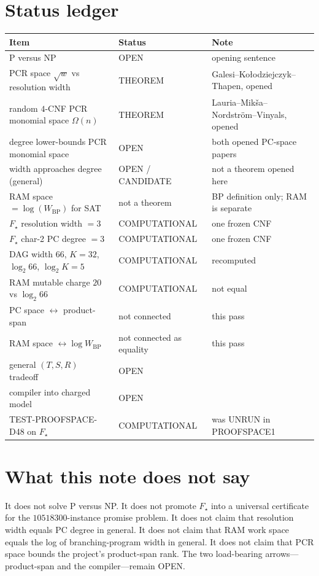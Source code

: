 \documentclass[11pt]{article}
\begin{document}
\section*{Status ledger}
\begin{center}
\begin{tabular}{@{}llp{2.4in}@{}}
\toprule
Item & Status & Note \\
\midrule
P versus NP & OPEN & opening sentence \\
PCR space \(\sqrt{w}\) vs resolution width & THEOREM & Galesi--Ko\l{}odziejczyk--Thapen, opened \\
random \(4\)-CNF PCR monomial space \(\Omega(n)\) & THEOREM & Lauria--Mik\v{s}a--Nordstr\"om--Vinyals, opened \\
degree lower-bounds PCR monomial space & OPEN & both opened PC-space papers \\
width approaches degree (general) & OPEN / CANDIDATE & not a theorem opened here \\
RAM space \(=\log(W_{\mathrm{BP}})\) for SAT & not a theorem & BP definition only; RAM is separate \\
\(F_\star\) resolution width \(=3\) & COMPUTATIONAL & one frozen CNF \\
\(F_\star\) char-2 PC degree \(=3\) & COMPUTATIONAL & one frozen CNF \\
DAG width \(66\), \(K=32\), \(\log_2 66\), \(\log_2 K=5\) & COMPUTATIONAL & recomputed \\
RAM mutable charge \(20\) vs \(\log_2 66\) & COMPUTATIONAL & not equal \\
PC space \(\leftrightarrow\) product-span & not connected & this pass \\
RAM space \(\leftrightarrow\log W_{\mathrm{BP}}\) & not connected as equality & this pass \\
general \((T,S,R)\) tradeoff & OPEN & \\
compiler into charged model & OPEN & \\
TEST-PROOFSPACE-D48 on \(F_\star\) & COMPUTATIONAL & was UNRUN in PROOFSPACE1 \\
\bottomrule
\end{tabular}
\end{center}

\section*{What this note does not say}
It does not solve P versus NP.
It does not promote \(F_\star\) into a universal certificate for the \(10518300\)-instance promise problem.
It does not claim that resolution width equals PC degree in general.
It does not claim that RAM work space equals the log of branching-program width in general.
It does not claim that PCR space bounds the project's product-span rank.
The two load-bearing arrows---product-span and the compiler---remain OPEN.
\end{document}

